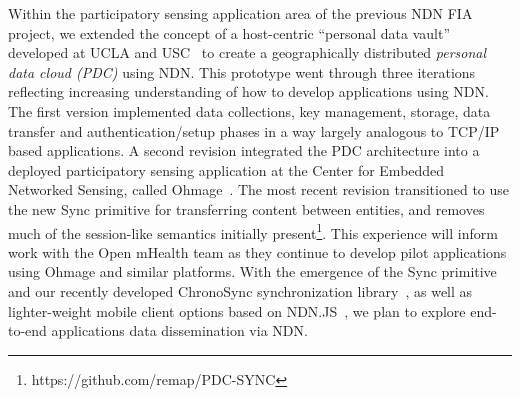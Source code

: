 Within the participatory sensing application area of the previous NDN
FIA project, we extended the concept of a host-centric ``personal data
vault'' developed at UCLA and USC~\cite{mun2010personal} to create a
geographically distributed \emph{personal data cloud (PDC)} using NDN.
This prototype went through three iterations reflecting increasing
understanding of how to develop applications using NDN.   The first
version implemented data collections, key management, storage, data
transfer and authentication/setup phases in a way largely analogous to
TCP/IP based applications.  A second revision integrated the PDC
architecture into a deployed participatory sensing application at the
Center for Embedded Networked Sensing, called
Ohmage~\cite{ramanathan2012ohmage}.
The most recent revision transitioned to use the
new Sync primitive for transferring content between entities, and removes
much of the session-like semantics initially
present\footnote{https://github.com/remap/PDC-SYNC}. This experience
will inform work with the Open mHealth team as they continue to develop
pilot applications using Ohmage and similar platforms. With the emergence
of the Sync primitive and our recently developed
ChronoSync synchronization library~\cite{Afanasyev13:CHRONOSYNC}, as well as lighter-weight mobile client
options based on NDN.JS~\cite{ndn-js-NOMEN}, we plan to explore end-to-end applications data dissemination via NDN.





